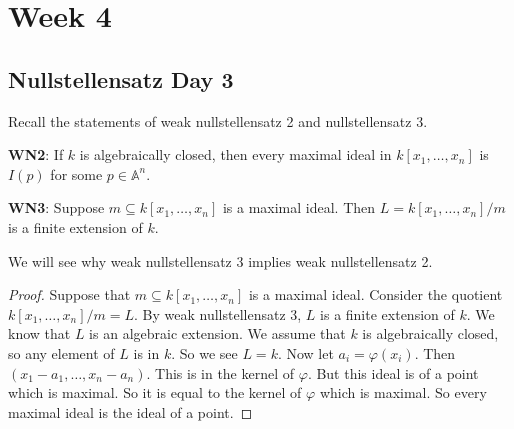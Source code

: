 \documentclass{report}
\begin{document}
\chapter{Week 4}

\begin{topic}
    \section{Nullstellensatz Day 3}
\end{topic}

Recall the statements of weak nullstellensatz 2 and nullstellensatz 3.

\textbf{WN2}: If $k$ is algebraically closed, then every maximal ideal in $k[x_{1}, \ldots , x_{n}]$ is $I(p)$ for some $p\in \mathbb{A}^{n}$.

\textbf{WN3}: Suppose $m \subseteq k[x_{1}, \ldots , x_{n}]$ is a maximal ideal. Then $L = k[x_{1}, \ldots , x_{n}]/m$ is a finite extension of $k$.

We will see why weak nullstellensatz 3 implies weak nullstellensatz 2. 
    \begin{proof}
        Suppose that $m \subseteq k[x_{1}, \ldots , x_{n}]$ is a maximal ideal. Consider the quotient $k[x_{1}, \ldots , x_{n}]/m = L$. By weak nullstellensatz 3, $L$ is a finite extension of $k$. We know that $L$ is an algebraic extension. We assume that $k$ is algebraically closed, so any element of $L$ is in $k$. So we see $L = k$. Now let $a_{i} = \varphi(x_{i})$. Then $(x_{1} - a_{1}, \ldots , x_{n} - a_{n})$. This is in the kernel of $\varphi$. But this ideal is of a point which is maximal. So it is equal to the kernel of $\varphi$ which is maximal. So every maximal ideal is the ideal of a point.
    \end{proof}
\end{document}
